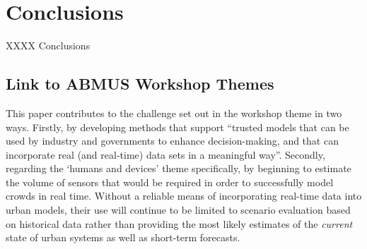 \documentclass[runningheads]{llncs}
\begin{document}
\section{Conclusions}

XXXX Conclusions

\subsection*{Link to ABMUS Workshop Themes}

This paper contributes to the challenge set out in the workshop theme in two ways. Firstly, by developing methods that support ``trusted models that can be used by industry and governments to enhance decision-making, and that can incorporate real (and real-time) data sets in a meaningful way''. Secondly, regarding the `humans and devices' theme specifically, by beginning to estimate the volume of sensors that would be required in order to successfully model crowds in real time. Without a reliable means of incorporating real-time data into urban models, their use will continue to be limited to scenario evaluation based on historical data rather than providing the most likely estimates of the \textit{current} state of urban systems as well as short-term forecasts.




\end{document}
